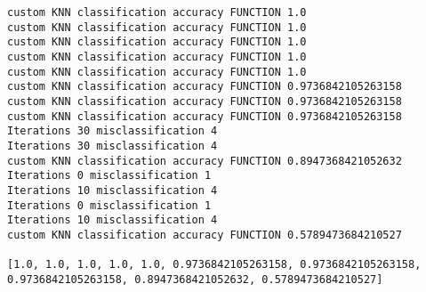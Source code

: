 \documentclass[11pt]{article}
\begin{document}
    \begin{Verbatim}[commandchars=\\\{\}]
custom KNN classification accuracy FUNCTION 1.0
custom KNN classification accuracy FUNCTION 1.0
custom KNN classification accuracy FUNCTION 1.0
custom KNN classification accuracy FUNCTION 1.0
custom KNN classification accuracy FUNCTION 1.0
custom KNN classification accuracy FUNCTION 0.9736842105263158
custom KNN classification accuracy FUNCTION 0.9736842105263158
custom KNN classification accuracy FUNCTION 0.9736842105263158
Iterations 30 misclassification 4
Iterations 30 misclassification 4
custom KNN classification accuracy FUNCTION 0.8947368421052632
Iterations 0 misclassification 1
Iterations 10 misclassification 4
Iterations 0 misclassification 1
Iterations 10 misclassification 4
custom KNN classification accuracy FUNCTION 0.5789473684210527

[1.0, 1.0, 1.0, 1.0, 1.0, 0.9736842105263158, 0.9736842105263158,
0.9736842105263158, 0.8947368421052632, 0.5789473684210527]
    \end{Verbatim}

    \begin{center}
    \end{center}
    { \hspace*{\fill} \\}
    
\end{document}
